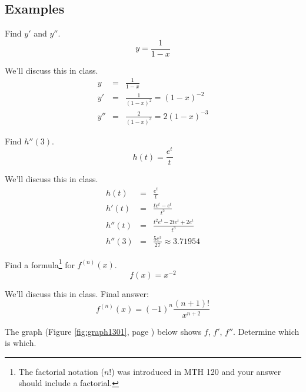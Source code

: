 \documentclass[12pt,addpoints, answers, fleqn]{exam}
\begin{document}
\subsection{Examples}
\begin{questions}
\question Find $y'$ and $y''$.
\[
y = \frac{1}{1-x}
\]

\begin{solution}
We'll discuss this in class.
\begin{eqnarray*}
y &=& \frac{1}{1-x}\\
y' &=& \frac{1}{\left( 1-x \right)^{2}} = \left( 1-x \right)^{-2}\\
y'' &=& \frac{2}{\left( 1-x \right)^{3}} = 2 \left( 1-x \right)^{-3}
\end{eqnarray*}

\end{solution}

\question Find $h''\left(3\right)$.
\[
h\left(t\right) = \frac{e^t}{t}
\]

\begin{solution}
We'll discuss this in class.
\begin{eqnarray*}
h\left(t\right) &=& \frac{e^t}{t}\\
h'\left(t\right) &=& \frac{t e^t - e^t}{t^2}\\
h''\left(t\right) &=& \frac{t^2 e^t - 2t e^t + 2e^t}{t^3}\\
h''\left(3\right) &=& \frac{5e^3}{27} \approx 3.71954
\end{eqnarray*}

\end{solution}

\question Find a formula\footnote{The factorial notation ($n!$) was introduced in MTH 120 and your answer should include a factorial.} for $f^{\left(n\right)}\left(x\right)$.
\[
f\left(x\right) = x^{-2}
\]

\begin{solution}
We'll discuss this in class. Final answer:
\[
f^{\left(n\right)}\left(x\right) =  \left( -1 \right)^{n} \frac{\left( n + 1 \right)!}{x^{n+2}}
\]
\end{solution}

\question The graph (Figure \ref{fig:graph1301}, page \pageref{fig:graph1301}) below shows $f$, $f'$, $f''$. Determine which is which.


\end{questions}
\end{document}

